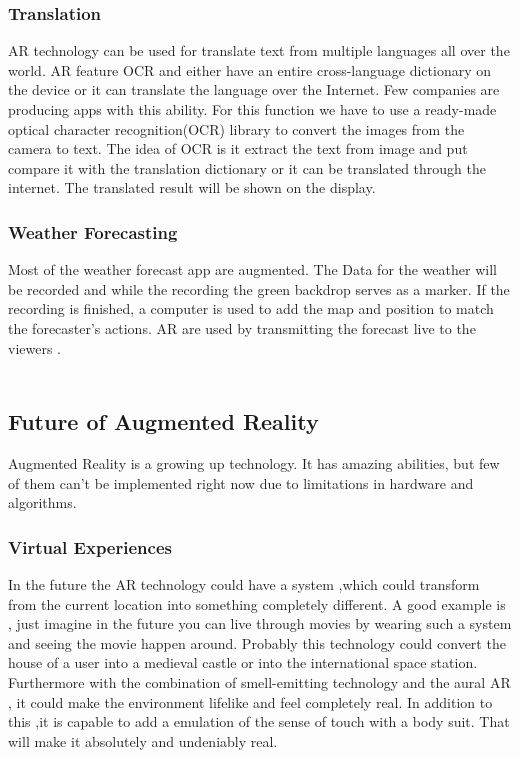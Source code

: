 \subsubsection{Translation}
 AR technology can be used for translate text from multiple languages all over the world. AR feature OCR and either have an entire cross-language dictionary on the device or it can translate the language over the Internet.    Few companies are producing apps with this ability. For this function we have to use  a ready-made optical character recognition(OCR) library to convert the images from the camera to text. The idea of OCR is it extract the text from image and put compare it with the translation dictionary or it can be translated through the internet. The translated result will be shown on the display.\cite{AugmentedBook}
 \\
 \subsubsection{Weather Forecasting}
 Most of the weather forecast app are augmented. The Data for the weather will be recorded and while the recording  the green backdrop serves as a  marker. If the recording is finished, a computer is used to add the map and position to match the forecaster's actions. AR  are used by transmitting the forecast live to the viewers .\cite{AugmentedBook}
 \\
 \\
 \subsection{Future of Augmented Reality}
 Augmented Reality is a growing up technology. It has amazing abilities, but few of them can't be implemented right now due to limitations in hardware and algorithms.\cite{AugmentedBook}
 \subsubsection{Virtual Experiences}
 
 
 
 In the future the AR technology could have a system ,which could transform from the current location into something completely different. A good example is , just imagine in the future you can live through movies by wearing  such a system and seeing the movie happen around. Probably this technology could convert the house of a user into a medieval castle or into the international space station. Furthermore with the combination  of smell-emitting technology and the aural AR , it could make the environment lifelike and  feel completely real. In addition to this ,it is capable to add a emulation of the sense of touch with a body suit. That will make it absolutely and undeniably real. \cite{AugmentedBook}
 \\
 \\
